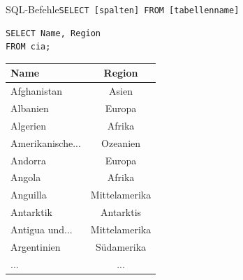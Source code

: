 \begin{frame}[fragile]{SQL-Befehle}{\lstinline|SELECT [spalten] FROM [tabellenname]|}
 \begin{lstlisting}
SELECT Name, Region
FROM cia;
\end{lstlisting}

 \begin{table}
   \centering
   \tiny
   \begin{tabular}{lc}
     \toprule
     \textbf{Name}    & \textbf{Region} \\
     \midrule
     Afghanistan      & Asien           \\
     Albanien         & Europa          \\
     Algerien         & Afrika          \\
     Amerikanische... & Ozeanien        \\
     Andorra          & Europa          \\
     Angola           & Afrika          \\
     Anguilla         & Mittelamerika   \\
     Antarktik        & Antarktis       \\
     Antigua und...   & Mittelamerika   \\
     Argentinien      & Südamerika      \\
     \midrule
     ...              & ...             \\
     \bottomrule
   \end{tabular}
 \end{table}
\end{frame}

